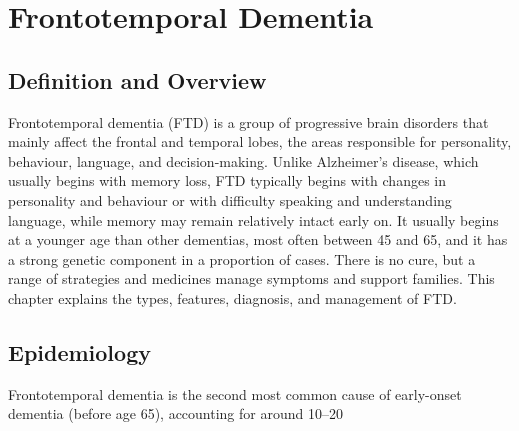 \chapter{Frontotemporal Dementia}

\section*{Definition and Overview}
Frontotemporal dementia (FTD) is a group of progressive brain disorders that mainly affect the frontal and temporal lobes, the areas responsible for personality, behaviour, language, and decision-making. Unlike Alzheimer's disease, which usually begins with memory loss, FTD typically begins with changes in personality and behaviour or with difficulty speaking and understanding language, while memory may remain relatively intact early on. It usually begins at a younger age than other dementias, most often between 45 and 65, and it has a strong genetic component in a proportion of cases. There is no cure, but a range of strategies and medicines manage symptoms and support families. This chapter explains the types, features, diagnosis, and management of FTD.

\section*{Epidemiology}
Frontotemporal dementia is the second most common cause of early-onset dementia (before age 65), accounting for around 10--20%

